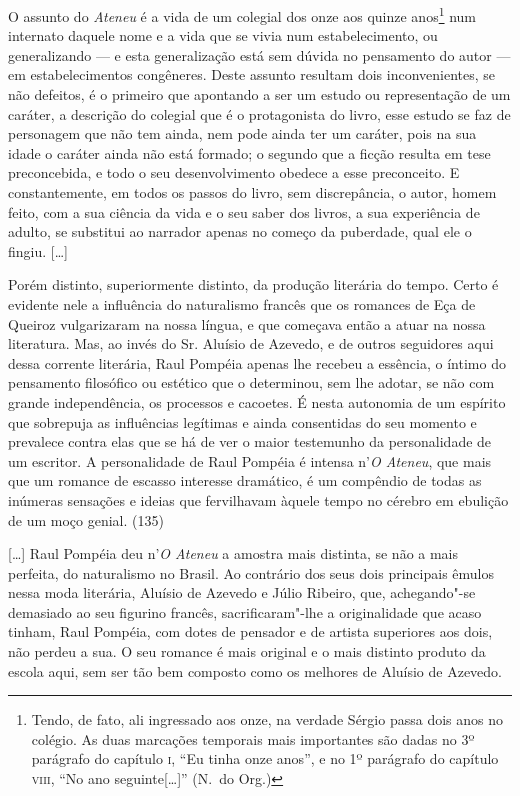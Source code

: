 O assunto do \textit{Ateneu}
é a vida de um colegial dos onze aos quinze anos\footnote{Tendo, de
fato, ali ingressado aos onze, na verdade Sérgio passa dois anos no
colégio. As duas marcações temporais mais importantes são dadas no
3º parágrafo do capítulo \textsc{i}, ``Eu tinha onze anos'', e
no 1º parágrafo do capítulo \textsc{viii}, ``No ano
seguinte[\ldots]'' (N.~do Org.)} num internato daquele nome
e a vida que se vivia num estabelecimento, ou generalizando --- e esta
generalização está sem dúvida no pensamento do autor --- em
estabelecimentos congêneres. Deste assunto resultam dois
inconvenientes, se não defeitos, é o primeiro que apontando a ser um
estudo ou representação de um caráter, a descrição do colegial que é o
protagonista do livro, esse estudo se faz de personagem que não tem
ainda, nem pode ainda ter um caráter, pois na sua idade o caráter ainda
não está formado; o segundo que a ficção resulta em tese preconcebida,
e todo o seu desenvolvimento obedece a esse preconceito. E
constantemente, em todos os passos do livro, sem discrepância, o autor,
homem feito, com a sua ciência da vida e o seu saber dos livros, a sua
experiência de adulto, se substitui ao narrador apenas no começo da
puberdade, qual ele o fingiu.
[\ldots] 

Porém distinto, superiormente distinto, da produção
literária do tempo. Certo é evidente nele a influência do naturalismo
francês que os romances de Eça de Queiroz vulgarizaram na nossa língua,
e que começava então a atuar na nossa literatura. Mas, ao invés do Sr.
Aluísio de Azevedo, e de outros seguidores aqui dessa corrente
literária, Raul Pompéia apenas lhe recebeu a essência, o íntimo do
pensamento filosófico ou estético que o determinou, sem lhe adotar, se
não com grande independência, os processos e cacoetes. É nesta
autonomia de um espírito que sobrepuja as influências legítimas e ainda
consentidas do seu momento e prevalece contra elas que se há de ver o
maior testemunho da personalidade de um escritor. A personalidade de
Raul Pompéia é intensa n'\textit{O Ateneu},
que mais que um romance de escasso interesse dramático, é um compêndio
de todas as inúmeras sensações e ideias que fervilhavam àquele tempo no
cérebro em ebulição de um moço genial.  (135)


[\ldots] Raul Pompéia deu n'\textit{O Ateneu} a amostra mais distinta, se não a mais
perfeita, do naturalismo no Brasil. Ao contrário dos seus dois
principais êmulos nessa moda literária, Aluísio de Azevedo e Júlio
Ribeiro, que, achegando"-se demasiado ao seu figurino francês,
sacrificaram"-lhe a originalidade que acaso tinham, Raul Pompéia, com
dotes de pensador e de artista superiores aos dois, não perdeu a sua. O
seu romance é mais original e o mais distinto produto da escola aqui,
sem ser tão bem composto como os melhores de Aluísio de Azevedo. 

